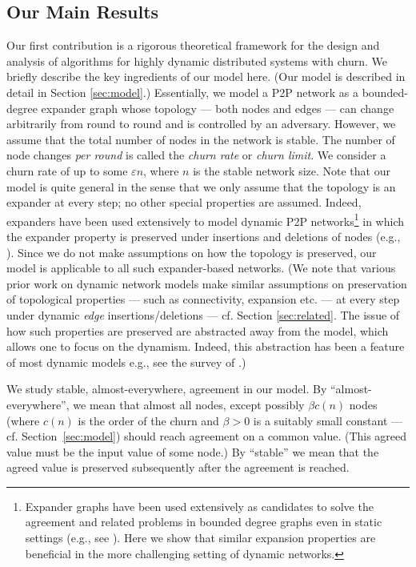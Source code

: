 \documentclass[leqno,11pt]{article}
\renewcommand{\epsilon}{\varepsilon}
\begin{document}
\subsection{Our Main Results}
 Our first contribution is a
rigorous theoretical framework for the design and analysis of algorithms for
highly dynamic distributed systems with churn. We briefly describe the key ingredients of our model here. (Our model is described in detail in  Section
\ref{sec:model}.) Essentially, we model a P2P network as a bounded-degree expander graph   whose topology --- both nodes and edges ---  can change arbitrarily from round to round and is controlled by an adversary. However, we assume
that the total number of nodes in the network is stable.  The number of node
changes {\em per round} is called the {\em churn rate} or {\em churn limit}. We
consider a churn rate of up to some $\epsilon n$,
where $n$ is the stable network size. Note that our model is quite general in the
sense that we only assume that the topology is an expander at every step; no other special
properties are assumed. Indeed,  expanders have been used extensively to
model dynamic P2P networks\footnote{Expander graphs
have been used extensively as candidates to solve the agreement and related problems
in bounded degree graphs even in static settings (e.g., see \cite{DPPU88,KKKSS10, KS10,KSS06, Upfal94}).  Here we show that similar expansion properties are beneficial in the more challenging setting of dynamic networks.}   in which the expander property is preserved under insertions and
deletions of nodes (e.g., \cite{LS03,PRU01}). 
 Since we do not make assumptions on how the topology is preserved,
 our model is applicable to all such expander-based networks.  (We note that  various prior work on  dynamic network models make similar assumptions on preservation of  topological  properties  --- such as connectivity, expansion etc. ---
 at every step  under dynamic {\em edge} insertions/deletions --- cf. Section \ref{sec:related}.  The issue
 of how such properties are preserved are abstracted away from the model, which allows one to focus on
 the dynamism. Indeed, this abstraction has been a feature of most dynamic
 models e.g., see the survey  of \cite{santoro}.) 
 
We study stable, almost-everywhere,  agreement in our model. By ``almost-everywhere'',
we mean that almost all nodes, except possibly $ \beta c(n)$ nodes (where $c(n)$ is the order of the churn and $\beta > 0$ is a suitably small constant --- cf. Section~\ref{sec:model}) should reach agreement on a common value.
(This agreed value must be the input value of some node.) By ``stable'' we mean that the agreed value is preserved subsequently after the agreement is reached.
 
\end{document}
